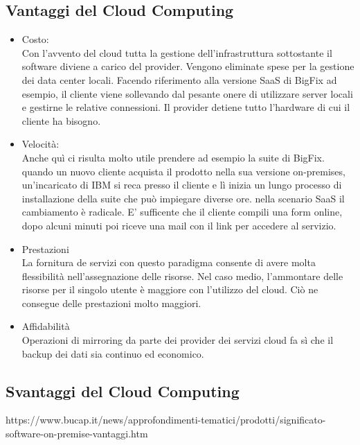 \subsection{Vantaggi del Cloud Computing}
\begin{itemize}
	\item Costo: \\
	Con l'avvento del cloud tutta la gestione dell'infrastruttura sottostante il software diviene a carico del provider. Vengono eliminate spese per la gestione dei data center locali. Facendo riferimento alla versione SaaS di BigFix ad esempio, il cliente viene sollevando dal pesante onere di utilizzare server locali e gestirne le relative connessioni. Il provider detiene tutto l'hardware di cui il cliente ha bisogno.
	
	\item Velocità: \\
	Anche quì ci risulta molto utile prendere ad esempio la suite di BigFix. quando un nuovo cliente acquista il prodotto nella sua versione on-premises, un'incaricato di IBM si reca presso il cliente e lì inizia un lungo processo di installazione della suite che può impiegare diverse ore. nella scenario SaaS il cambiamento è radicale. E' sufficente che il cliente compili una form online, dopo alcuni minuti poi riceve una mail con il link per accedere al servizio.
	
	\item Prestazioni \\
	La fornitura de servizi con questo paradigma consente di avere molta flessibilità nell'assegnazione delle risorse. Nel caso medio, l'ammontare delle risorse per il singolo utente è maggiore con l'utilizzo del cloud. Ciò ne consegue delle prestazioni molto maggiori.
	
	\item Affidabilità \\
	Operazioni di mirroring da parte dei provider dei servizi cloud fa sì che il backup dei dati sia continuo ed economico.
	
	
\end{itemize}
\subsection{Svantaggi del Cloud Computing}
https://www.bucap.it/news/approfondimenti-tematici/prodotti/significato-software-on-premise-vantaggi.htm